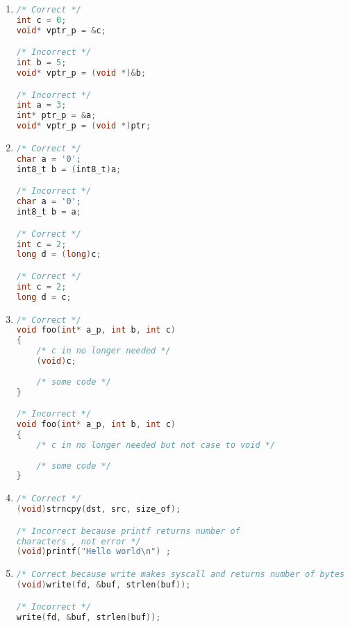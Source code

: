 \begin{enumerate}
    \item 
\begin{lstlisting}[language=C,style=C99]
/* Correct */
int c = 0;
void* vptr_p = &c;

/* Incorrect */
int b = 5;
void* vptr_p = (void *)&b;

/* Incorrect */
int a = 3;
int* ptr_p = &a;
void* vptr_p = (void *)ptr;
\end{lstlisting}

    \item 
\begin{lstlisting}[language=C,style=C99]
/* Correct */
char a = '0';
int8_t b = (int8_t)a;

/* Incorrect */
char a = '0';
int8_t b = a;

/* Correct */
int c = 2;
long d = (long)c;

/* Correct */
int c = 2;
long d = c;
\end{lstlisting}

    \item 
\begin{lstlisting}[language=C,style=C99]
/* Correct */
void foo(int* a_p, int b, int c)
{
    /* c in no longer needed */
    (void)c;
    
    /* some code */
}

/* Incorrect */
void foo(int* a_p, int b, int c)
{
    /* c in no longer needed but not case to void */
    
    /* some code */
}
\end{lstlisting}

    \item 
\begin{lstlisting}[language=C,style=C99]
/* Correct */
(void)strncpy(dst, src, size_of);

/* Incorrect because printf returns number of 
characters , not error */
(void)printf("Hello world\n") ;
\end{lstlisting}
    
    \item 
\begin{lstlisting}[language=C,style=C99]
/* Correct because write makes syscall and returns number of bytes written, which can be used to check success or -1 if failure */
(void)write(fd, &buf, strlen(buf));

/* Incorrect */
write(fd, &buf, strlen(buf));
\end{lstlisting}
\end{enumerate}

